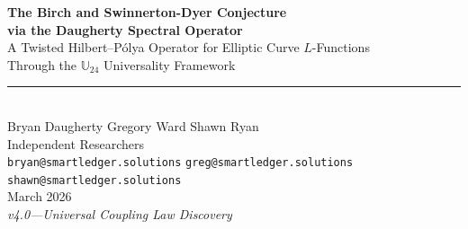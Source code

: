 \documentclass[11pt,a4paper]{article}
\theoremstyle{plain}
\theoremstyle{definition}
\theoremstyle{remark}
\begin{document}
\thispagestyle{empty}


\vspace*{20pt}
\begin{center}

{\fontsize{22}{26}\selectfont\bfseries\color{accent}
The Birch and Swinnerton-Dyer Conjecture\\[2pt]
via the Daugherty Spectral Operator}\\[12pt]
{\large\color{accentlight}
A Twisted Hilbert--P\'olya Operator for Elliptic Curve $L$-Functions\\
Through the $\mathbb{U}_{24}$ Universality Framework}\\[20pt]

{\color{titlegold}\rule{6cm}{0.8pt}}\\[20pt]

{\Large Bryan Daugherty \quad Gregory Ward \quad Shawn Ryan}\\[8pt]
{\small\color{subtlegray}
Independent Researchers\\[2pt]
\texttt{bryan@smartledger.solutions}\quad
\texttt{greg@smartledger.solutions}\quad
\texttt{shawn@smartledger.solutions}}\\[16pt]

{\normalsize\color{subtlegray} March 2026}\\[6pt]
{\small\color{subtlegray}\itshape v4.0\enspace---\enspace Universal Coupling Law Discovery}

\end{center}
\vspace{16pt}
\end{document}
